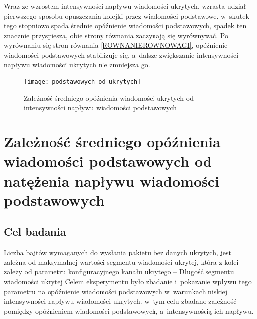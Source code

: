 \documentclass[a4paper, twoside, 12pt]{report}
\begin{document}
            Wraz ze wzrostem intensywności napływu wiadomości ukrytych, wzrasta udział
            pierwszego sposobu opuszczania kolejki przez wiadomości podstawowe.
            w~skutek tego stopniowo spada średnie opóźnienie wiadomości podstawowych,
            spadek ten znacznie przyspiesza, obie strony równania zaczynają się wyrównywać.
            Po wyrównaniu się stron równania \ref{ROWNANIEROWNOWAGI},
            opóźnienie wiadomości podstawowych stabilizuje się, a~dalsze zwiększanie
            intensywności napływu wiadomości ukrytych nie zmniejsza go.

        \begin{figure}[h]
                \centering
                \texttt{[image: podstawowych\_od\_ukrytych]}
                \caption{Zależność średniego opóźnienia wiadomości ukrytych od
                    intensywności napływu wiadomości podstawowych}
                \label{OPOZNIENIEPODSTAWOWYCHODUKRYTYCH}
        \end{figure}



    \section{Zależność średniego opóźnienia wiadomości podstawowych od natężenia napływu wiadomości podstawowych} \label{BADANIEDLUGOSCISEGMENTUDANYCHUKRYTYCH}
        \subsection{Cel badania}
            Liczba bajtów wymaganych do wysłania pakietu bez danych ukrytych,
            jest zależna od maksymalnej wartości segmentu wiadomości ukrytej, która
            z kolei zależy od parametru konfiguracyjnego kanału ukrytego -- Długość segmentu wiadomości ukrytej
            Celem eksperymentu było zbadanie i~pokazanie wpływu tego parametru
            na opóźnienie wiadomości podstawowych w~warunkach niskiej intensywności
            napływu wiadomości ukrytych. w~tym celu zbadano zależność pomiędzy
            opóźnieniem wiadomości podstawowych, a~intensywnością ich napływu.
\end{document}
